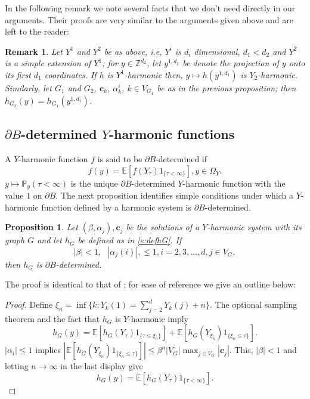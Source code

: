 \documentclass[11pt,a4paper]{article}
\newtheorem{remark}{Remark}
\newtheorem{proposition}{Proposition}[section]
\begin{document}
In the following remark we note several facts that we don't need
directly in our arguments. Their proofs
are very similar to the arguments given above and are left to the
reader:
\begin{remark}
{\em
Let $Y^1$ and $Y^2$ be as above, i.e, $Y^i$ is $d_i$ dimensional, $d_1 < d_2$
and $Y^2$ is a simple extension of $Y^1$;  for $y \in {\mathbb Z}^{d_2}$,
let $y^{1,d_1}$ be denote the projection of $y$ onto its first $d_1$ 
coordinates. 
If $h$ is $Y^1$-harmonic then, $y\mapsto h(y^{1,d_1})$ is $Y_2$-harmonic.
Similarly, let $G_1$ and $G_2$, ${\boldsymbol c}_k$, $\alpha_k^i$,
$k \in V_{G_1}$ be 
as in the previous proposition; then $h_{G_2}(y) = h_{G_1}(y^{1,d_1})$.
}
\end{remark}




\subsection{$\partial B$-determined $Y$-harmonic functions}
A $Y$-harmonic function $f$ is said to be
$\partial B$-determined if
\[
f(y) = {\mathbb E}[f(Y_{\tau}) 1_{\{\tau < \infty \}}], y \in \Omega_Y.
\]
$y \mapsto {\mathbb P}_y(\tau < \infty)$ is the unique $\partial B$-determined
$Y$-harmonic function with the value $1$ on $\partial B$.
The next proposition identifies simple conditions under which
a $Y$-harmonic function defined by a harmonic system is $\partial B$-determined.

\begin{proposition}\label{p:balayagesimpled}
Let $(\beta,\alpha_j), {\boldsymbol c}_j$ be the solutions of a $Y$-harmonic system
with its graph $G$ and let $h_G$ be defined as in \eqref{e:defhG}.
If 
\[
|\beta| < 1,~~~|\alpha_j(i)|, \le 1, i=2,3,...,d, j \in V_G,
\]
then $h_G$ is $\partial B$-determined.
\end{proposition}
The proof is identical to that of \cite[Proposition 5]{sezer2018approximation};
for ease of reference we give an outline below:
\begin{proof}
Define $\xi_n = \inf\{k: Y_k(1) = \sum_{j=2}^d Y_k(j) + n \}.$
The optional sampling theorem and the fact that $h_G$ is $Y$-harmonic
imply
\[
h_G(y) = {\mathbb E}[ h_G(Y_\tau) 1_{\{\tau \le \xi_n\}}]
+ {\mathbb E}[h_G(Y_{\xi_n}) 1_{\{\xi_n \le \tau\}}].
\]
$|\alpha_i| \le 1$ implies
$|{\mathbb E}[h_G(Y_{\xi_n}) 1_{\{\xi_n \le \tau\}}]| \le \beta^n |V_G|\max_{j\in V_G} |{\boldsymbol c}_j|$. This, $|\beta| < 1$ and letting 
$n\rightarrow \infty$ in the last display give
\[
h_G(y) = {\mathbb E}[ h_G(Y_\tau) 1_{\{\tau < \infty \}}].
\]


\end{proof}
\end{document}
